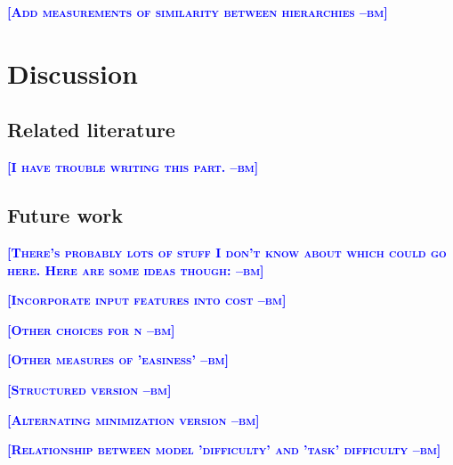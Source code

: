 \documentclass{article} %
\newcommand{\bmcomment}[1]{\textcolor{blue}{\textsc{\textbf{[#1 --bm]}}}}
\begin{document}
\bmcomment{Add measurements of similarity between hierarchies}


%
%
% 
% 


\section{Discussion}

\subsection{Related literature}

\bmcomment{I have trouble writing this part.}

\subsection{Future work}

\bmcomment{There's probably lots of stuff I don't know about
which could go here.  Here are some ideas though:}

\bmcomment{Incorporate input features into cost}

\bmcomment{Other choices for n}

\bmcomment{Other measures of 'easiness'}

\bmcomment{Structured version}

\bmcomment{Alternating minimization version}

\bmcomment{Relationship between model 'difficulty' and 'task' difficulty}
\end{document}
